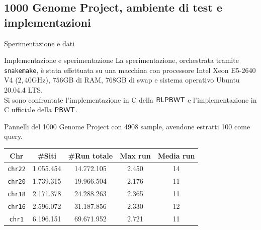 \documentclass[]{beamer}
\def\PBWT{\mbox{\rm {\sf PBWT}}}
\def\RLPBWT{\mbox{\rm {\sf RLPBWT}}}
\def\Cplusplus{C\raisebox{0.5ex}{\tiny\textbf{++}}}
\begin{document}
\subsection{1000 Genome Project, ambiente di test e implementazioni}
\begin{frame}{Sperimentazione e dati}
   \begin{block}{Implementazione e sperimentazione}
    \small
    La sperimentazione, orchestrata tramite \texttt{snakemake}, è stata
    effettuata su una macchina con processore 
    Intel Xeon E5-2640 V4 ($2,40$GHz), $756$GB di RAM, $768$GB di swap e
    sistema operativo Ubuntu 20.04.4 LTS.\\
    Si sono confrontate l'implementazione in \Cplusplus $\,\,$della $\RLPBWT$ e
    l'implementazione in C ufficiale della $\PBWT$.
  \end{block}
  \begin{block}{Pannelli del 1000 Genome Project con 4908 sample, avendone
      estratti 100 come query.
    } 
    \begin{table}
      \footnotesize
      \centering
      \begin{tabular}{c||c|c|c|c}
        \textbf{Chr} & \textbf{\#Siti} & \textbf{\#Run totale}
        & \textbf{Max run} & \textbf{Media run} \\ 
        \hline
        \texttt{chr22} & 1.055.454 & 14.772.105 & 2.450 & 14\\
        \texttt{chr20} & 1.739.315 & 19.966.504 & 2.176 & 11\\
        \texttt{chr18} & 2.171.378 & 24.288.263 & 2.365 & 11\\
        \texttt{chr16} & 2.596.072 & 31.187.856 & 2.330 & 12\\
        \texttt{chr1} & 6.196.151 & 69.671.952 & 2.721 & 11\\
      \end{tabular}
    \end{table}
  \end{block}
\end{frame}
\end{document}
